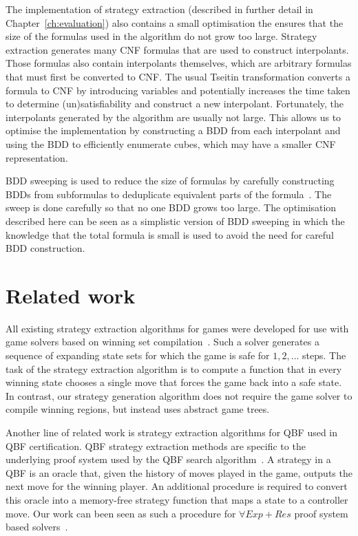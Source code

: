 The implementation of strategy extraction (described in further detail in Chapter~\ref{ch:evaluation}) also contains a small optimisation the ensures that the size of the formulas used in the algorithm do not grow too large. Strategy extraction generates many CNF formulas that are used to construct interpolants. Those formulas also contain interpolants themselves, which are arbitrary formulas that must first be converted to CNF. The usual Tseitin transformation converts a formula to CNF by introducing variables and potentially increases the time taken to determine (un)satisfiability and construct a new interpolant. Fortunately, the interpolants generated by the algorithm are usually not large. This allows us to optimise the implementation by constructing a BDD from each interpolant and using the BDD to efficiently enumerate cubes, which may have a smaller CNF representation. 

BDD sweeping is used to reduce the size of formulas by carefully constructing BDDs from subformulas to deduplicate equivalent parts of the formula~\cite{Kuehlmann97}. The sweep is done carefully so that no one BDD grows too large. The optimisation described here can be seen as a simplistic version of BDD sweeping in which the knowledge that the total formula is small is used to avoid the need for careful BDD construction.

\section{Related work}

All existing strategy extraction algorithms for games were developed for use with game solvers based on winning set compilation~\cite{Bloem14}.  Such a solver generates a sequence of expanding state sets for which the game is safe for $1,2,\ldots$ steps.  The task of the strategy extraction algorithm is to compute a function that in every winning state chooses a single move that forces the game back into a safe state.  In contrast, our strategy generation algorithm does not require the game solver to compile winning regions, but instead uses abstract game trees.

Another line of related work is strategy extraction algorithms for QBF used in QBF certification. QBF strategy extraction methods are specific to the underlying proof system used by the QBF search algorithm~\cite{Lonsing10,Egly13,Goultiaeva11}.  A strategy in a QBF is an oracle that, given the history of moves played in the game, outputs the next move for the winning player.  An additional procedure is required to convert this oracle into a memory-free strategy function that maps a state to a controller move.  Our work can been seen as such a procedure for $\forall Exp+Res$ proof system based solvers~\cite{Janota13}.

